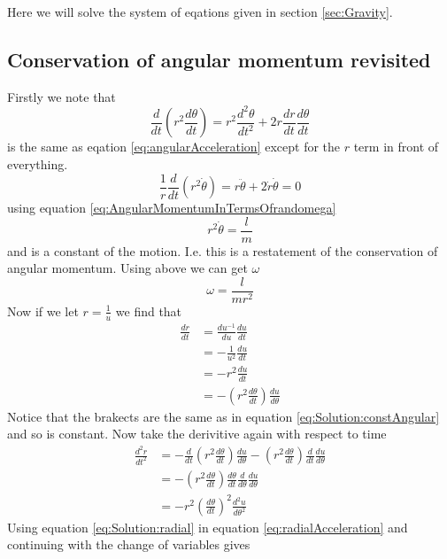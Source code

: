 Here we will solve the system of eqations given in section \ref{sec:Gravity}.
\subsection{Conservation of angular momentum revisited}
Firstly we note that
\begin{equation}
\frac{d}{dt}\left(r^2 \frac{d\theta}{dt}\right)=r^2 \frac{d^2\theta}{dt^2} + 2r\frac{dr}{dt}\frac{d\theta}{dt}
\end{equation}
is the same as eqation \ref{eq:angularAcceleration} except for the $r$ term in front of everything.
\begin{equation}
\frac{1}{r}\frac{d}{dt}\left(r^2 \dot{\theta}\right)=r\ddot{\theta} + 2\dot{r}\dot{\theta}=0\label{eq:Solution:constAngular}
\end{equation}
using equation \ref{eq:AngularMomentumInTermsOfrandomega}
\begin{equation}
r^2 \dot{\theta}=\frac{l}{m} \label{eq:Solution:const}
\end{equation}
and is a constant of the motion. I.e. this is a restatement of the conservation of angular momentum.
Using above we can get $\omega$
\begin{equation}
\omega=\frac{l}{mr^2}
\end{equation}
Now if we let $r=\frac{1}{u}$ we find that
\begin{align}
\frac{dr}{dt}&=\frac{du^{-1}}{du}\frac{du}{dt} \nonumber \\
&=-\frac{1}{u^2}\frac{du}{dt} \nonumber \\
&=-r^2\frac{du}{dt} \nonumber \\
&=-\left(r^2\frac{d\theta}{dt}\right)\frac{du}{d\theta} 
\end{align}
Notice that the brakects are the same as in equation \ref{eq:Solution:constAngular} and so is constant.
Now take the derivitive again with respect to time 
\begin{align}
\frac{d^2r}{dt^2}&=-\frac{d}{dt}\left(r^2\frac{d\theta}{dt}\right)\frac{du}{d\theta} - \left(r^2\frac{d\theta}{dt}\right)\frac{d}{dt}\frac{du}{d\theta} \nonumber \\
&=- \left(r^2\frac{d\theta}{dt}\right)\frac{d\theta}{dt}\frac{d}{d\theta}\frac{du}{d\theta} \nonumber \\
&=- r^2\left(\frac{d\theta}{dt}\right)^2\frac{d^2u}{d\theta^2} \label{eq:Solution:radial}
\end{align}
Using equation \ref{eq:Solution:radial} in equation \ref{eq:radialAcceleration} and continuing with the change of variables gives
